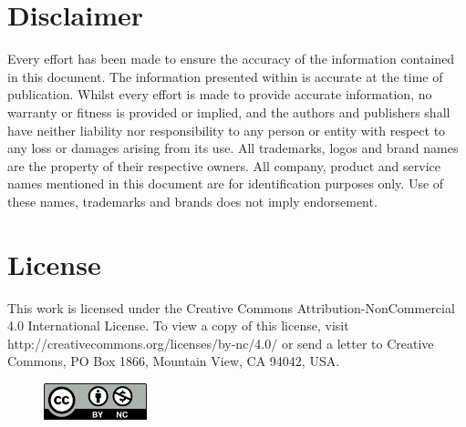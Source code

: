 
\onecolumn\null\vfill

\section*{Disclaimer}
Every effort has been made to ensure the accuracy of the information contained in this document. The information presented within is accurate at the time of publication.  Whilst every effort is made to provide accurate information, no warranty or fitness is provided or implied, and the authors and publishers shall have neither liability nor responsibility to any person or entity with respect to any loss or damages arising from its use.
All trademarks, logos and brand names are the property of their respective owners. All company, product and service names mentioned in this document are for identification purposes only. Use of these names, trademarks and brands does not imply endorsement.

\section*{License}
This work is licensed under the Creative Commons Attribution-NonCommercial 4.0 International License. To view a copy of this license, visit http://creativecommons.org/licenses/by-nc/4.0/ or send a letter to Creative Commons, PO Box 1866, Mountain View, CA 94042, USA.
\begin{figure}[h!]
	\includegraphics[width=3cm]{images/by-nc.png}
\end{figure}
